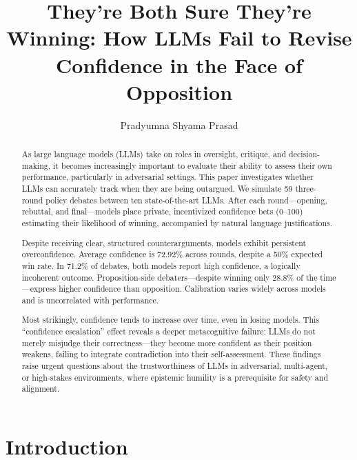 \documentclass[11pt]{article}
\title{They’re Both Sure They’re Winning: How LLMs Fail to Revise Confidence in the Face of Opposition}
\author[1]{Pradyumna Shyama Prasad}
\affil[1]{National University of Singapore}
\date{} %
\begin{document}
\maketitle

\begin{abstract}
    As large language models (LLMs) take on roles in oversight, critique, and decision-making, it becomes increasingly important to evaluate their ability to assess their own performance, particularly in adversarial settings. This paper investigates whether LLMs can accurately track when they are being outargued. We simulate 59 three-round policy debates between ten state-of-the-art LLMs. After each round—opening, rebuttal, and final—models place private, incentivized confidence bets (0–100) estimating their likelihood of winning, accompanied by natural language justifications.

    Despite receiving clear, structured counterarguments, models exhibit persistent overconfidence. Average confidence is 72.92\% across rounds, despite a 50\% expected win rate. In 71.2\% of debates, both models report high confidence, a logically incoherent outcome. Proposition-side debaters—despite winning only 28.8\% of the time—express higher confidence than opposition. Calibration varies widely across models and is uncorrelated with performance.

    Most strikingly, confidence tends to increase over time, even in losing models. This “confidence escalation” effect reveals a deeper metacognitive failure: LLMs do not merely misjudge their correctness—they become more confident as their position weakens, failing to integrate contradiction into their self-assessment. These findings raise urgent questions about the trustworthiness of LLMs in adversarial, multi-agent, or high-stakes environments, where epistemic humility is a prerequisite for safety and alignment.

    \end{abstract}

\section{Introduction}
\end{document}
